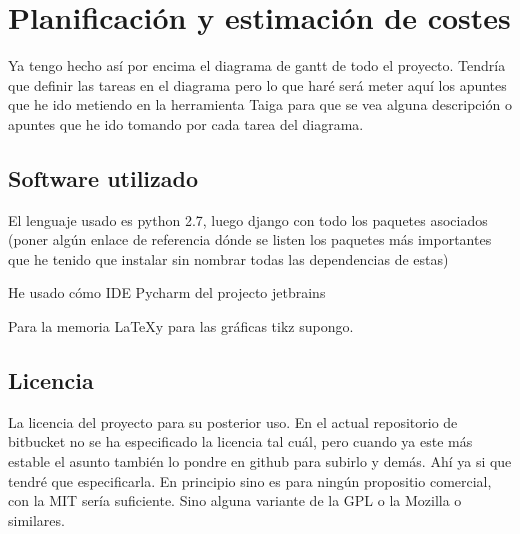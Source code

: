 \chapter{Planificación y estimación de costes}
\label{chap:planificacion}

Ya tengo hecho así por encima el diagrama de gantt de todo el proyecto. Tendría que definir las tareas en el diagrama pero lo que haré será meter aquí los apuntes que he ido metiendo en la herramienta Taiga para que se vea alguna descripción o apuntes que he ido tomando por cada tarea del diagrama.


\section{Software utilizado}

El lenguaje usado es python 2.7, luego django con todo los paquetes asociados (poner algún enlace de referencia dónde se listen los paquetes más importantes que he tenido que instalar sin nombrar todas las dependencias de estas)

He usado cómo IDE Pycharm del projecto jetbrains

Para la memoria \LaTeX y para las gráficas tikz supongo.

\section{Licencia}

La licencia del proyecto para su posterior uso. En el actual repositorio de bitbucket no se ha especificado la licencia tal cuál, pero cuando ya este más estable el asunto también lo pondre en github para subirlo y demás. Ahí ya si que tendré que especificarla. En principio sino es para ningún propositio comercial, con la MIT sería suficiente. Sino alguna variante de la GPL o la Mozilla o similares.


